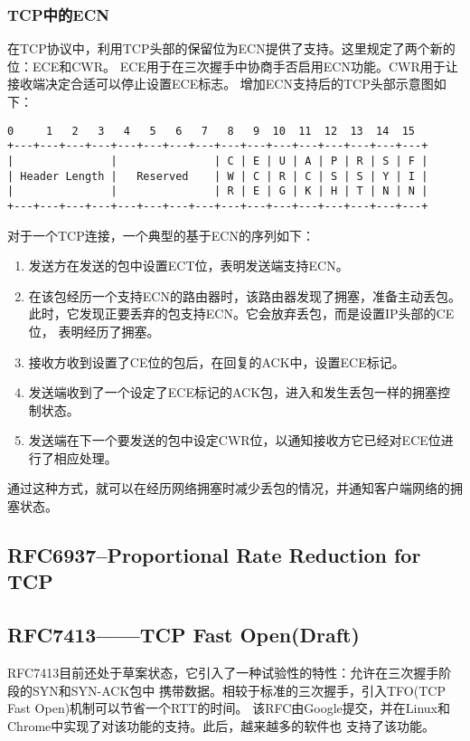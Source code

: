 \subsubsection{TCP中的ECN}
在TCP协议中，利用TCP头部的保留位为ECN提供了支持。这里规定了两个新的位：ECE和CWR。
ECE用于在三次握手中协商手否启用ECN功能。CWR用于让接收端决定合适可以停止设置ECE标志。
增加ECN支持后的TCP头部示意图如下：
\begin{verbatim}
0     1   2   3   4   5   6   7   8   9  10  11  12  13  14  15 
+---+---+---+---+---+---+---+---+---+---+---+---+---+---+---+---+ 
|               |               | C | E | U | A | P | R | S | F | 
| Header Length |   Reserved    | W | C | R | C | S | S | Y | I | 
|               |               | R | E | G | K | H | T | N | N | 
+---+---+---+---+---+---+---+---+---+---+---+---+---+---+---+---+
\end{verbatim}

对于一个TCP连接，一个典型的基于ECN的序列如下：
\begin{enumerate}
  \item 发送方在发送的包中设置ECT位，表明发送端支持ECN。
  \item 在该包经历一个支持ECN的路由器时，该路由器发现了拥塞，准备主动丢包。
    此时，它发现正要丢弃的包支持ECN。它会放弃丢包，而是设置IP头部的CE位，
    表明经历了拥塞。
  \item 接收方收到设置了CE位的包后，在回复的ACK中，设置ECE标记。
  \item 发送端收到了一个设定了ECE标记的ACK包，进入和发生丢包一样的拥塞控制状态。
  \item 发送端在下一个要发送的包中设定CWR位，以通知接收方它已经对ECE位进行了相应处理。
\end{enumerate}

通过这种方式，就可以在经历网络拥塞时减少丢包的情况，并通知客户端网络的拥塞状态。

\subsection{RFC6937--Proportional Rate Reduction for TCP}
\label{subsec:rfc6937}

    
\subsection{RFC7413——TCP Fast Open(Draft)}
\label{subsec:rfc7413}

RFC7413目前还处于草案状态，它引入了一种试验性的特性：允许在三次握手阶段的SYN和SYN-ACK包中
携带数据。相较于标准的三次握手，引入TFO(TCP Fast Open)机制可以节省一个RTT的时间。
该RFC由Google提交，并在Linux和Chrome中实现了对该功能的支持。此后，越来越多的软件也
支持了该功能。

